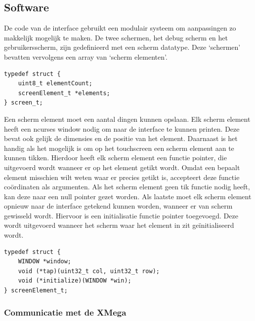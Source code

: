 \subsection{Software}
De code van de interface gebruikt een modulair systeem om aanpassingen zo makkelijk mogelijk te maken. De twee schermen, het debug scherm en het gebruikersscherm, zijn gedefinieerd met een scherm datatype.
Deze `schermen' bevatten vervolgens een array van `scherm elementen'.

\begin{minipage}{\textwidth}
    \begin{lstlisting}[caption={Het datatype van de schermen},captionpos=b,label={lst:screen_t},style=c,xleftmargin=.\textwidth,xrightmargin=.\textwidth]
typedef struct {
    uint8_t elementCount;
    screenElement_t *elements;
} screen_t;
    \end{lstlisting}
\end{minipage}

Een scherm element moet een aantal dingen kunnen opslaan. Elk scherm element heeft een ncurses window nodig om naar de interface te kunnen printen. Deze bevat ook gelijk de dimensies en de positie van het element.
Daarnaast is het handig als het mogelijk is om op het touchscreen een scherm element aan te kunnen tikken. Hierdoor heeft elk scherm element een functie pointer, die uitgevoerd wordt wanneer er op het element getikt wordt. Omdat een bepaalt element misschien wilt weten waar er precies getikt is, accepteert deze functie coördinaten als argumenten. Als het scherm element geen tik functie nodig heeft, kan deze naar een null pointer gezet worden. Als laatste moet elk scherm element opnieuw naar de interface getekend kunnen worden, wanneer er van scherm gewisseld wordt. Hiervoor is een initialisatie functie pointer toegevoegd. Deze wordt uitgevoerd wanneer het scherm waar het element in zit geïnitialiseerd wordt.

\begin{lstlisting}[caption={Het datatype van de scherm elementen},captionpos=b,label={lst:screenElement_t},style=c,xleftmargin=.\textwidth,xrightmargin=.\textwidth]
typedef struct {
    WINDOW *window;
    void (*tap)(uint32_t col, uint32_t row);
    void (*initialize)(WINDOW *win);
} screenElement_t;    
\end{lstlisting}

\subsubsection*{Communicatie met de XMega}

